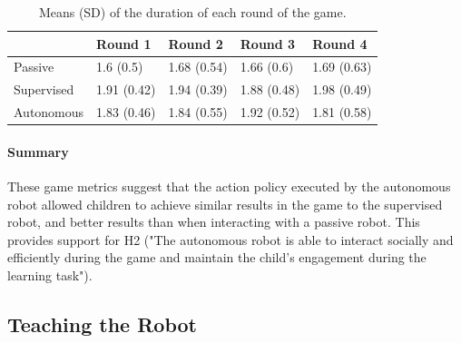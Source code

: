 \begin{table}[ht]
	\centering
	\caption{Means (SD) of the duration of each round of the game.}
	\label{tab:tuto_results_time}
	\begin{tabularx}{\textwidth}{@{}L{1.}L{1}L{1}L{1}L{1}@{}}\toprule
		& Round 1 & Round 2 & Round 3 & Round 4\\ 
		\midrule 
		Passive & 1.6 (0.5) & 1.68 (0.54) & 1.66 (0.6) & 1.69 (0.63)\\ 
		Supervised & 1.91 (0.42) & 1.94 (0.39) & 1.88 (0.48) & 1.98 (0.49)\\ 
		Autonomous & 1.83 (0.46) & 1.84 (0.55) & 1.92 (0.52) & 1.81 (0.58)\\ 
		
		\bottomrule
	\end{tabularx}
\end{table}

\paragraph{Summary}

These game metrics suggest that the action policy executed by the autonomous robot allowed children to achieve similar results in the game to the supervised robot, and better results than when interacting with a passive robot. This provides support for H2 ("The autonomous robot is able to interact socially and efficiently during the game and maintain the child's engagement during the learning task"). 

\subsection{Teaching the Robot}

